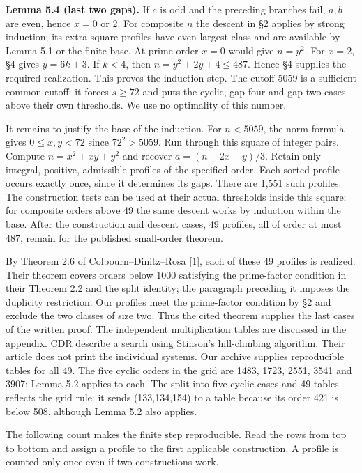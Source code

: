 \documentclass[english,11pt,a4paper]{article}
\begin{document}
\textbf{Lemma 5.4 (last two gaps).} If \(c\) is odd and the preceding branches fail, \(a,b\) are even, hence \(x=0\) or 2. For composite \(n\) the descent in §2 applies by strong induction; its extra square profiles have even largest class and are available by Lemma 5.1 or the finite base. At prime order \(x=0\) would give \(n=y^2\). For \(x=2\), §4 gives \(y=6k+3\). If \(k<4\), then \(n=y^2+2y+4\le487\). Hence §4 supplies the required realization. This proves the induction step. The cutoff 5059 is a sufficient common cutoff: it forces \(s\ge72\) and puts the cyclic, gap-four and gap-two cases above their own thresholds. We use no optimality of this number.

It remains to justify the base of the induction. For \(n<5059\), the norm formula gives \(0\le x,y<72\) since \(72^2>5059\). Run through this square of integer pairs. Compute \(n=x^2+xy+y^2\) and recover \(a=(n-2x-y)/3\). Retain only integral, positive, admissible profiles of the specified order. Each sorted profile occurs exactly once, since it determines its gaps. There are 1,551 such profiles. The construction tests can be used at their actual thresholds inside this square; for composite orders above 49 the same descent works by induction within the base. After the construction and descent cases, 49 profiles, all of order at most 487, remain for the published small-order theorem.

By Theorem 2.6 of Colbourn--Dinitz--Rosa {[}1{]}, each of these 49 profiles is realized. Their theorem covers orders below 1000 satisfying the prime-factor condition in their Theorem 2.2 and the split identity; the paragraph preceding it imposes the duplicity restriction. Our profiles meet the prime-factor condition by §2 and exclude the two classes of size two. Thus the cited theorem supplies the last cases of the written proof. The independent multiplication tables are discussed in the appendix. CDR describe a search using Stinson's hill-climbing algorithm. Their article does not print the individual systems. Our archive supplies reproducible tables for all 49. The five cyclic orders in the grid are 1483, 1723, 2551, 3541 and 3907; Lemma 5.2 applies to each. The split into five cyclic cases and 49 tables reflects the grid rule: it sends (133,134,154) to a table because its order 421 is below 508, although Lemma 5.2 also applies.

The following count makes the finite step reproducible. Read the rows from top to bottom and assign a profile to the first applicable construction. A profile is counted only once even if two constructions work.
\end{document}
